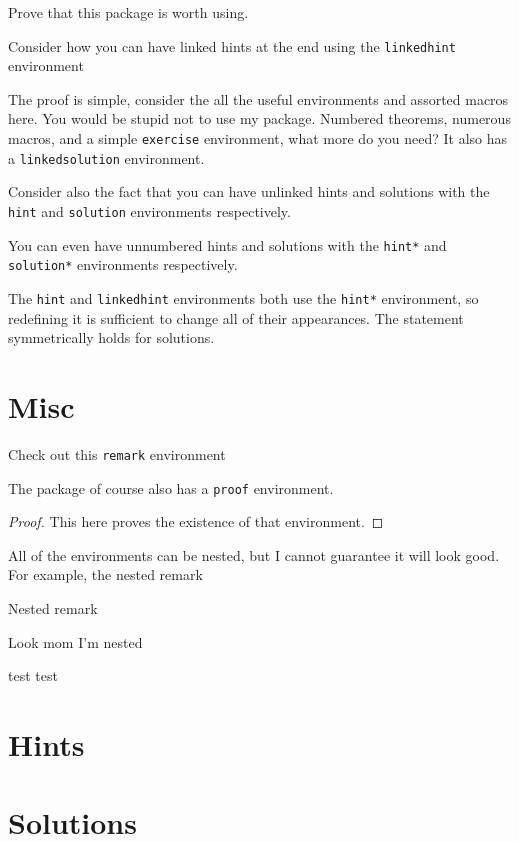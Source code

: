 \documentclass{article}
\begin{document}
\begin{exercise}
Prove that this package is worth using.
\end{exercise}

\begin{linkedhint}
Consider how you can have linked hints at the end using the \texttt{linkedhint} environment
\end{linkedhint}
\begin{linkedsolution}
The proof is simple, consider the all the useful environments and assorted macros here.
You would be stupid not to use my package.
Numbered theorems, numerous macros, and a simple \texttt{exercise} environment, what more do you need?
It also has a \texttt{linkedsolution} environment.
\end{linkedsolution}

\begin{hint}
Consider also the fact that you can have unlinked hints and solutions with the \texttt{hint} and \texttt{solution} environments respectively.
\end{hint}

\begin{hint*}
You can even have unnumbered hints and solutions with the \texttt{hint*} and \texttt{solution*} environments respectively.
\end{hint*}

The \texttt{hint} and \texttt{linkedhint} environments both use the \texttt{hint*} environment, so redefining it is sufficient to change all of their appearances.
The statement symmetrically holds for solutions.

\section{Misc}

\begin{remark} Check out this \texttt{remark} environment\end{remark}

The package of course also has a \texttt{proof} environment.

\begin{proof}
This here proves the existence of that environment.
\end{proof}

All of the environments can be nested, but I cannot guarantee it will look good.
For example, the nested remark

\begin{remark}
Nested remark
\begin{remark}
Look mom I'm nested
\end{remark}
\end{remark}

\begin{varremark}
	test test
\end{varremark}

\section{Hints}

\printhints

\section{Solutions}

\printsols
\end{document}
